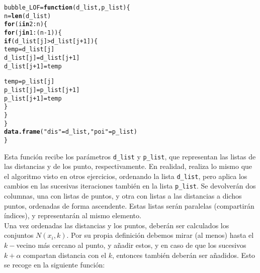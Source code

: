 \documentclass[12pt]{report}\usepackage[]{graphicx}\usepackage[dvipsnames]{xcolor}
\makeatletter
\newcommand{\hlnum}[1]{\textcolor[rgb]{0.686,0.059,0.569}{#1}}%
\newcommand{\hlstr}[1]{\textcolor[rgb]{0.192,0.494,0.8}{#1}}%
\newcommand{\hlopt}[1]{\textcolor[rgb]{0,0,0}{#1}}%
\newcommand{\hlstd}[1]{\textcolor[rgb]{0.345,0.345,0.345}{#1}}%
\newcommand{\hlkwa}[1]{\textcolor[rgb]{0.161,0.373,0.58}{\textbf{#1}}}%
\newcommand{\hlkwb}[1]{\textcolor[rgb]{0.69,0.353,0.396}{#1}}%
\newcommand{\hlkwc}[1]{\textcolor[rgb]{0.333,0.667,0.333}{#1}}%
\newcommand{\hlkwd}[1]{\textcolor[rgb]{0.737,0.353,0.396}{\textbf{#1}}}%
\newenvironment{kframe}{%
 \def\at@end@of@kframe{}%
 \ifinner\ifhmode%
  \def\at@end@of@kframe{\end{minipage}}%
  \begin{minipage}{\columnwidth}%
 \fi\fi%
 \def\FrameCommand##1{\hskip\@totalleftmargin \hskip-\fboxsep
 \colorbox{shadecolor}{##1}\hskip-\fboxsep
     \hskip-\linewidth \hskip-\@totalleftmargin \hskip\columnwidth}%
 \MakeFramed {\advance\hsize-\width
   \@totalleftmargin\z@ \linewidth\hsize
   \@setminipage}}%
 {\par\unskip\endMakeFramed%
 \at@end@of@kframe}
\newenvironment{knitrout}{}{} %
\makeatother
\begin{document}
\begin{knitrout}
\color{fgcolor}\begin{kframe}
\begin{alltt}
\hlstd{bubble_LOF} \hlkwb{=} \hlkwa{function}\hlstd{(}\hlkwc{d_list}\hlstd{,} \hlkwc{p_list}\hlstd{)\{}
        \hlstd{n} \hlkwb{=} \hlkwd{len}\hlstd{(d_list)}
        \hlkwa{for} \hlstd{(i} \hlkwa{in} \hlnum{2}\hlopt{:}\hlstd{n)\{}
                \hlkwa{for} \hlstd{(j} \hlkwa{in} \hlnum{1}\hlopt{:}\hlstd{(n}\hlopt{-}\hlnum{1}\hlstd{))\{}
                        \hlkwa{if} \hlstd{(d_list[j]} \hlopt{>} \hlstd{d_list[j}\hlopt{+}\hlnum{1}\hlstd{])\{}
                                \hlstd{temp} \hlkwb{=} \hlstd{d_list[j]}
                                \hlstd{d_list[j]} \hlkwb{=} \hlstd{d_list[j}\hlopt{+}\hlnum{1}\hlstd{]}
                                \hlstd{d_list[j}\hlopt{+}\hlnum{1}\hlstd{]} \hlkwb{=} \hlstd{temp}

                                \hlstd{temp} \hlkwb{=} \hlstd{p_list[j]}
                                \hlstd{p_list[j]} \hlkwb{=} \hlstd{p_list[j}\hlopt{+}\hlnum{1}\hlstd{]}
                                \hlstd{p_list[j}\hlopt{+}\hlnum{1}\hlstd{]} \hlkwb{=} \hlstd{temp}
                        \hlstd{\}}
                \hlstd{\}}
        \hlstd{\}}
        \hlkwd{data.frame}\hlstd{(}\hlstr{"dis"}\hlstd{=d_list,} \hlstr{"poi"}\hlstd{=p_list)}
\hlstd{\}}
\end{alltt}
\end{kframe}
\end{knitrout}
					
					Esta función recibe los parámetros \texttt{d\_list} y \texttt{p\_list}, que representan las listas de las distancias y de los punto, respectivamente. En realidad, realiza lo mismo que el algoritmo visto en otros ejercicios, ordenando la lista \texttt{d\_list}, pero aplica los cambios en las sucesivas iteraciones también en la lista \texttt{p\_list}. Se devolverán dos columnas, una con listas de puntos, y otra con listas a las distancias a dichos puntos, ordenadas de forma ascendente. Estas listas serán paralelas (compartirán índices), y representarán al mismo elemento. \\
					
					Una vez ordenadas las distancias y los puntos, deberán ser calculados los conjuntos $N(x_i, k)$. Por su propia definición debemos mirar (al menos) hasta el $k-$vecino más cercano al punto, y añadir estos, y en caso de que los sucesivos $k+\alpha$ compartan distancia con el $k$, entonces también deberán ser añadidos. Esto se recoge en la siguiente función: 
					
\end{document}
